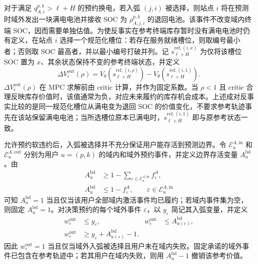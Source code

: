 \documentclass[12pt,a4paper,UTF8]{ctexart}
\begin{document}
对于满足 $q_{A,i}^{p,k}>\ell+H$ 的预约换电，若入弧 $(j,i)$ 被选择，则站点 $i$ 将在预测时域外发出一块满电电池并接收 SOC 为 $\rho_{A,j,i}^{p,k}$ 的退回电池。该事件不改变域内终端 SOC，因而需要单独估值。为使反事实在参考终端库存暂时没有满电电池时仍有定义，在站点 $i$ 选择一个规范化槽位：若存在服务就绪槽位，则取编号最小者；否则取 SOC 最高者，并以最小编号打破并列。记 $s_{\ell+H}^{\mathrm{ref},(i,x)}$ 为仅将该槽位 SOC 置为 $x$、其余状态保持不变的参考终端状态，并定义
\begin{equation}
\Delta V_{i}^{\mathrm{out}}(\rho)
=
 V_\theta\!\left(s_{\ell+H}^{\mathrm{ref},(i,\rho)}\right)
-V_\theta\!\left(s_{\ell+H}^{\mathrm{ref},(i,1)}\right).
\label{eq:outside_swap_value}
\end{equation}
$\Delta V_{i}^{\mathrm{out}}(\rho)$ 在 MPC 求解前由 critic 计算，并作为固定系数。当 $\rho<1$ 且 critic 合理反映库存价值时，该值通常为负，对应未来履约的库存机会成本。上述成对反事实比较的是同一规范化槽位从满电变为退回 SOC 的价值变化，不要求参考轨迹事先在该站保留满电电池；当所选槽位原本已满电时，$s_{\ell+H}^{\mathrm{ref},(i,1)}$ 即与原参考状态一致。

允许预约软违约后，入弧被选择并不充分保证用户能存活到预测边界。令 $\mathcal E_u^{A,\mathrm{in}}$ 和 $\mathcal E_u^{A,\mathrm{out}}$ 分别为用户 $u=(p,k)$ 的域内和域外预约事件，并定义边界存活变量 $A_u^{\mathrm{bd}}$。由
\begin{subequations}
\label{eq:boundary_alive}
\begin{align}
A_u^{\mathrm{bd}}
&\ge 1-\sum_{\varepsilon\in\mathcal E_u^{A,\mathrm{in}}}
f_\varepsilon^A,\\
A_u^{\mathrm{bd}}
&\le 1-f_\varepsilon^A,
\qquad \varepsilon\in\mathcal E_u^{A,\mathrm{in}}
\end{align}
\end{subequations}
可知 $A_u^{\mathrm{bd}}=1$ 当且仅当该用户全部域内激活事件均已履约；若域内事件集为空，则固定 $A_u^{\mathrm{bd}}=1$。对决策预约的每个域外事件 $\varepsilon$，以 $y_\varepsilon$ 简记其入弧变量，并定义
\begin{subequations}
\label{eq:outside_event_alive}
\begin{align}
w_\varepsilon^{\mathrm{out}}&\le y_\varepsilon,&
w_\varepsilon^{\mathrm{out}}&\le A_{u(\varepsilon)}^{\mathrm{bd}},\\
w_\varepsilon^{\mathrm{out}}
&\ge y_\varepsilon+A_{u(\varepsilon)}^{\mathrm{bd}}-1.
\end{align}
\end{subequations}
因此 $w_\varepsilon^{\mathrm{out}}=1$ 当且仅当域外入弧被选择且用户未在域内失败。固定承诺的域外事件已包含在参考轨迹中；若其用户在域内失败，则用 $A_u^{\mathrm{bd}}-1$ 撤销该参考价值。
\end{document}
